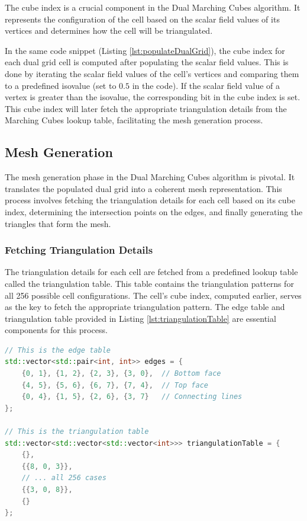 The cube index is a crucial component in the Dual Marching Cubes algorithm. It represents the configuration of the cell based on the scalar field values of its vertices and determines how the cell will be triangulated.

In the same code snippet (Listing \ref{lst:populateDualGrid}), the cube index for each dual grid cell is computed after populating the scalar field values. This is done by iterating the scalar field values of the cell's vertices and comparing them to a predefined isovalue (set to \(0.5\) in the code). If the scalar field value of a vertex is greater than the isovalue, the corresponding bit in the cube index is set. This cube index will later fetch the appropriate triangulation details from the Marching Cubes lookup table, facilitating the mesh generation process.

\subsection{Mesh Generation}

The mesh generation phase in the Dual Marching Cubes algorithm is pivotal. It translates the populated dual grid into a coherent mesh representation. This process involves fetching the triangulation details for each cell based on its cube index, determining the intersection points on the edges, and finally generating the triangles that form the mesh.

\subsubsection{Fetching Triangulation Details}

The triangulation details for each cell are fetched from a predefined lookup table called the triangulation table. This table contains the triangulation patterns for all 256 possible cell configurations. The cell's cube index, computed earlier, serves as the key to fetch the appropriate triangulation pattern. The edge table and triangulation table provided in Listing \ref{lst:triangulationTable} are essential components for this process.

\vspace{2mm}
\begin{lstlisting}[language=C++, caption=Edge and Triangulation Tables, label=lst:triangulationTable]
// This is the edge table
std::vector<std::pair<int, int>> edges = {
	{0, 1}, {1, 2}, {2, 3}, {3, 0},  // Bottom face
	{4, 5}, {5, 6}, {6, 7}, {7, 4},  // Top face
	{0, 4}, {1, 5}, {2, 6}, {3, 7}   // Connecting lines
};

// This is the triangulation table
std::vector<std::vector<std::vector<int>>> triangulationTable = {
	{},
	{{8, 0, 3}},
	// ... all 256 cases
	{{3, 0, 8}},
	{}
};
\end{lstlisting}

